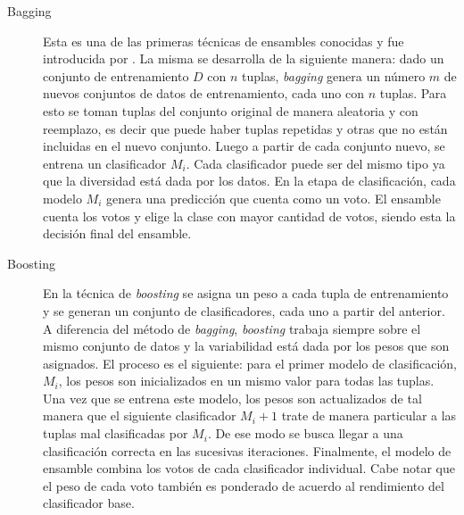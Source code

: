 \begin{description} 

   \item[Bagging] Esta es una de las primeras técnicas de ensambles conocidas y
      fue introducida por
      \citeauthor{breiman_bagging_1996}\cite{breiman_bagging_1996}. La misma se
      desarrolla de la siguiente manera: dado un conjunto de entrenamiento $D$
      con $n$  tuplas, \textit{bagging} genera un número $m$ de nuevos conjuntos
      de datos de entrenamiento, cada uno con $n$ tuplas. Para esto se toman
      tuplas del conjunto original de manera aleatoria y con reemplazo, es decir
      que puede haber tuplas repetidas y otras que no están incluidas en el
      nuevo conjunto.  Luego a partir de cada conjunto nuevo, se entrena un
      clasificador $M_{i}$. Cada clasificador puede ser del mismo tipo ya que la
      diversidad está dada por los datos. En la etapa de clasificación, cada
      modelo $M_{i}$ genera una predicción que cuenta como un voto. El ensamble
      cuenta los votos y elige la clase con mayor cantidad de votos, siendo esta
      la decisión final del ensamble.


   \item[Boosting] En la técnica de \textit{boosting} se asigna un peso a cada
      tupla de entrenamiento y se generan un conjunto de clasificadores, cada
      uno a partir del anterior. A diferencia del método de \textit{bagging},
      \textit{boosting} trabaja siempre sobre el mismo conjunto de datos y la
      variabilidad está dada por los pesos que son asignados. El proceso es el
      siguiente: para el primer modelo de clasificación, $M_{i}$, los pesos son
      inicializados en un mismo valor para todas las tuplas. Una vez que se
      entrena este modelo, los pesos son actualizados de tal manera que el
      siguiente clasificador $M_{i} + 1$ trate de manera particular a las tuplas
      mal clasificadas por $M_{i}$. De ese modo se busca llegar a una
      clasificación correcta en las sucesivas iteraciones.  Finalmente, el
      modelo de ensamble combina los votos de cada clasificador individual. Cabe
      notar que el peso de cada voto también es ponderado de acuerdo al
      rendimiento del clasificador base.



\end{description}
